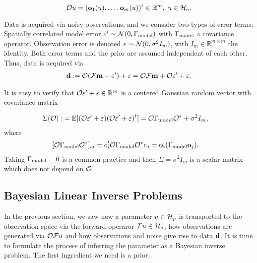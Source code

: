 \begin{equation*}%
  \obs u = (\meas_1(u), \dots, \meas_m(u) )^t \in \R^m,\ u \in \hilo.
\end{equation*}

Data is acquired via noisy observations, and we consider two types of
error terms: Spatially correlated model error \(\varepsilon' \sim
\mathcal{N}(0,\Gamma_{\textup{model}})\) with \(\Gamma_{\textup{model}}\) a covariance operator. Observation
error is denoted \(\varepsilon \sim \mathcal{N}(0, \sigma^2 I_m)\), with \(I_m \in
\mathbb{R}^{m \times m}\) the identity. Both error terms and the prior
are assumed independent of each other. Thus, data is acquired via
\begin{align}\label{eq:inverse problem}
  \data := \obs (\fwd \param + \eps') + \eps = \obs \fwd \param + \obs \eps' + \eps.
\end{align}

It is easy to verify that \(\mathcal{O} \varepsilon' + \varepsilon \in \mathbb{R}^m\) is a centered
Gaussian random vector with covariance matrix

\begin{align}\label{eq:Sigma}
  \begin{split}
    \Sigma(\obs) :&= \mathbb{E}[ (\obs \eps' + \eps) (\obs \eps' +
      \eps)^t ]
    = \obs \modcov \obs^* + \sigma^2I_m , 
  \end{split}
\end{align}
where
\begin{align}\label{eq:modcov explained}
  \begin{split}
    [\obs \modcov \obs^*]_{ij} & = e_i^t \obs \modcov \obs^* e_j 
    = \meas_i (\modcov \meas_j).%
  \end{split}
\end{align}
Taking \(\Gamma_{\textup{model}} = 0\) is a common practice
\cite{tarantola2005,Kaipio2005,Vogel02} and then \(\Sigma =
\sigma^2I_m\) is a scalar matrix which does not depend on \(\mathcal{O}\).

\subsection{Bayesian Linear Inverse Problems}\label{subsec:bayesian inverse problems}
In the previous section, we saw how a parameter $u\in \mathcal{H}_p$ is
transported to the observation space via the forward operaror $\mathcal{F} u
\in \mathcal{H}_o$, how observations are generated via $\mathcal{O} \mathcal{F} u$ and how
observations and noise give rise to data $\mathbf{d}$. It is time to
formulate the process of inferring the parameter as a Bayesian inverse
problem. The first ingredient we need is a prior.

